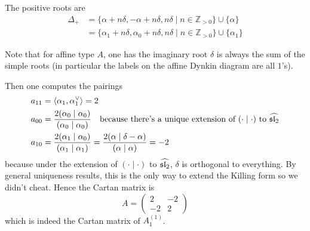 \documentclass[12pt]{article}
\begin{document}
\begin{example}
The positive roots are \begin{align*}
        \Delta_+ & = \{\alpha + n\delta, -\alpha + n\delta, n\delta \mid n \in \mathbb{Z}_{>0}\} \cup \{\alpha\} \\
                & = \{\alpha_1 + n\delta, \alpha_0 + n\delta, n\delta \mid n \in \mathbb{Z}_{>0}\} \cup \{\alpha_1\}
\end{align*}

    Note that for affine type $A$, one has the imaginary root $\delta$ is always the sum of the simple roots (in particular the labels on the affine Dynkin diagram are all $1$'s).

    Then one computes the pairings \begin{align*}
        a_{11} & = \langle \alpha_1, \alpha_1^\vee \rangle = 2 \\
        a_{00} & = \frac{2(\alpha_0 \mid \alpha_0)}{(\alpha_0 \mid \alpha_0)} \texty{because there's a unique extension of $(\cdot \mid \cdot)$ to $\widehat{\sl_2}$}     \\
        a_{10} & = \frac{2(\alpha_1 \mid \alpha_0)}{(\alpha_1 \mid \alpha_1)} = \frac{2(\alpha \mid \delta - \alpha)}{(\alpha \mid \alpha)} = -2                          \\
    \end{align*} because under the extension of $(\cdot \mid \cdot)$ to $\widehat{\sl_2}$, $\delta$ is orthogonal to everything. By general uniqueness results, this is the only way to extend the Killing form so we didn't cheat. Hence the Cartan matrix is \[
        A = \begin{pmatrix}
            2  & -2 \\
            -2 & 2
        \end{pmatrix}
    \] which is indeed the Cartan matrix of $A_1^{(1)}$.
\end{example}
\end{document}
